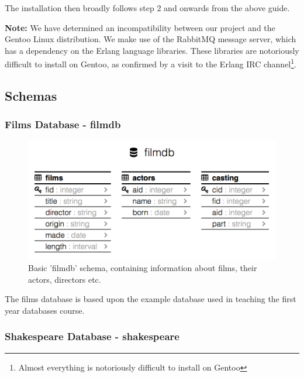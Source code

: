 \documentclass[a4paper, 11pt]{article}
\begin{document}
  The installation then broadly follows step 2 and onwards from the above
  guide. 

  \textbf{Note:} We have determined an incompatibility between our project and
  the Gentoo Linux distribution. We make use of the RabbitMQ message server,
  which has a dependency on the Erlang language libraries. These libraries
  are notoriously difficult to install on Gentoo, as confirmed by a visit to
  the Erlang IRC channel\footnote{Almost everything is notoriously difficult to
  install on Gentoo}.

  \subsection{Schemas}

    \subsubsection{Films Database - filmdb}
    \label{sec:appfilmdb}

      \begin{figure}[H]
        \includegraphics[width=\textwidth]{images/site_schema.png}
        \caption{Basic 'filmdb' schema, containing information about films,
        their actors, directors etc.}
      \end{figure}

      The films database is based upon the example database used in teaching
      the first year databases course.

    \subsubsection{Shakespeare Database - shakespeare}
\end{document}
